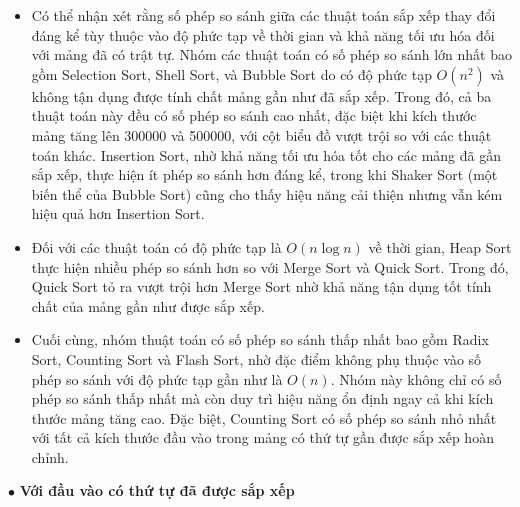\begin{itemize}[label=$\circ$]
    \item Có thể nhận xét rằng số phép so sánh giữa các thuật toán sắp 
    xếp thay đổi đáng kể tùy thuộc vào độ phức tạp về thời gian và khả 
    năng tối ưu hóa đối với mảng đã có trật tự. Nhóm các thuật toán có 
    số phép so sánh lớn nhất bao gồm Selection Sort, Shell Sort, và 
    Bubble Sort do có độ phức tạp $O\left(n^2\right)$ và không tận dụng 
    được tính chất mảng gần như đã sắp xếp. Trong đó, cả ba thuật toán 
    này đều có số phép so sánh cao nhất, đặc biệt khi kích thước mảng 
    tăng lên 300000 và 500000, với cột biểu đồ vượt trội so với các 
    thuật toán khác. Insertion Sort, nhờ khả năng tối ưu hóa tốt cho 
    các mảng đã gần sắp xếp, thực hiện ít phép so sánh hơn đáng kể, 
    trong khi Shaker Sort (một biến thể của Bubble Sort) cũng cho thấy 
    hiệu năng cải thiện nhưng vẫn kém hiệu quả hơn Insertion Sort. 
	\item Đối với các thuật toán có độ phức tạp là $O\left(n\log{n}\right)$ 
    về thời gian, Heap Sort thực hiện nhiều phép so sánh hơn so với Merge 
    Sort và Quick Sort. Trong đó, Quick Sort tỏ ra vượt trội hơn Merge 
    Sort nhờ khả năng tận dụng tốt tính chất của mảng gần như được sắp xếp. 
	\item Cuối cùng, nhóm thuật toán có số phép so sánh thấp nhất bao 
    gồm Radix Sort, Counting Sort và Flash Sort, nhờ đặc điểm không phụ 
    thuộc vào số phép so sánh với độ phức tạp gần như là $O\left(n\right)$. 
    Nhóm này không chỉ có số phép so sánh thấp nhất mà còn duy trì hiệu 
    năng ổn định ngay cả khi kích thước mảng tăng cao. Đặc biệt, Counting 
    Sort có số phép so sánh nhỏ nhất với tất cả kích thước đầu vào trong 
    mảng có thứ tự gần được sắp xếp hoàn chỉnh.
\end{itemize}

$\bullet$ \textbf{Với đầu vào có thứ tự đã được sắp xếp}

